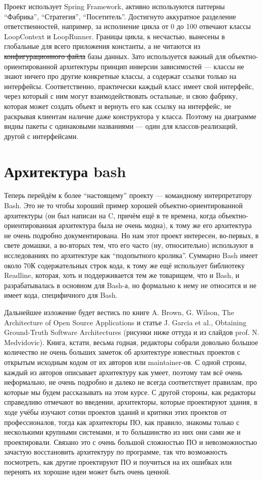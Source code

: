 \documentclass[a5paper]{article}
\begin{document}
Проект использует Spring Framework, активно используются паттерны ``Фабрика'', ``Стратегия'', ``Посетитель''. Достигнуто аккуратное разделение ответственностей, например, за исполнение цикла от 0 до 100 отвечают классы LoopContext и LoopRunner. Границы цикла, к несчастью, вынесены в глобальные для всего приложения константы, а не читаются из \sout{конфигурационного файла} базы данных. Зато используется важный для объектно-ориентированной архитектуры принцип инверсии зависимостей --- классы не знают ничего про другие конкретные классы, а содержат ссылки только на интерфейсы. Соответственно, практически каждый класс имеет свой интерфейс, через который с ним могут взаимодействовать остальные, и свою фабрику, которая может создать объект и вернуть его как ссылку на интерфейс, не раскрывая клиентам наличие даже конструктора у класса. Поэтому на диаграмме видны пакеты с одинаковыми названиями --- один для классов-реализаций, другой с интерфейсами.

\section{Архитектура bash}

Теперь перейдём к более ``настоящему'' проекту --- командному интерпретатору Bash. Это не то чтобы хороший пример хорошей объектно-ориентированной архитектуры (он был написан на C, причём ещё в те времена, когда объектно-ориентированная архитектура была не очень модна), к тому же его архитектура не очень подробно документирована. Но нам этот проект интересен, во-первых, в свете домашки, а во-вторых тем, что его часто (ну, относительно) используют в исследованиях по архитектуре как ``подопытного кролика''. Суммарно Bash имеет около 70К содержательных строк кода, к тому же ещё использует библиотеку Readline, которая, хоть и поддерживается тем же товарищем, что и Bash, и разрабатывалась в основном для Bash-а, но формально к нему не относится и не имеет кода, специфичного для Bash.

Дальнейшее изложение будет вестись по книге A. Brown, G. Wilson, The Architecture of Open Source Applications и статье J. Garcia et al., Obtaining Ground-Truth Software Architectures (рисунки ниже оттуда и из слайдов prof. N. Medvidovic). Книга, кстати, весьма годная, редакторы собрали довольно большое количество не очень больших заметок об архитектуре известных проектов с открытым исходным кодом от их авторов или maintainer-ов. С одной строны, каждый из авторов описывает архитектуру как умеет, поэтому там всё очень неформально, не очень подробно и далеко не всегда соответствует правилам, про которые мы будем рассказывать на этом курсе. С другой стороны, как редакторы справедливо отмечают во введении, архитекторы, которые проектируют здания, в ходе учёбы изучают сотни проектов зданий и критики этих проектов от профессионалов, тогда как архитекторы ПО, как правило, знакомы только с несколькими крупными системами, и то большинство из них они сами же и проектировали. Связано это с очень большой сложностью ПО и невозможностью зачастую восстановить архитектуру по программе, так что возможность посмотреть, как другие проектируют ПО и поучиться на их ошибках или перенять их хорошие идеи может быть очень ценной.
\end{document}
